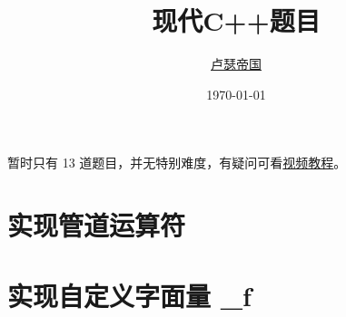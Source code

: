 \documentclass[11pt,fancyhdr]{ctexart}
\title{现代C++题目}
\author{\href{https://github.com/Mq-b/Loser-HomeWork}{卢瑟帝国}\\}
\date{\today}
\begin{document}
\maketitle

暂时只有 13 道题目，并无特别难度，有疑问可看\href{https://www.bilibili.com/video/BV1Zj411r7eP/}{视频教程}。


\section{实现管道运算符}



\section{实现自定义字面量 \_f}


\end{document}
